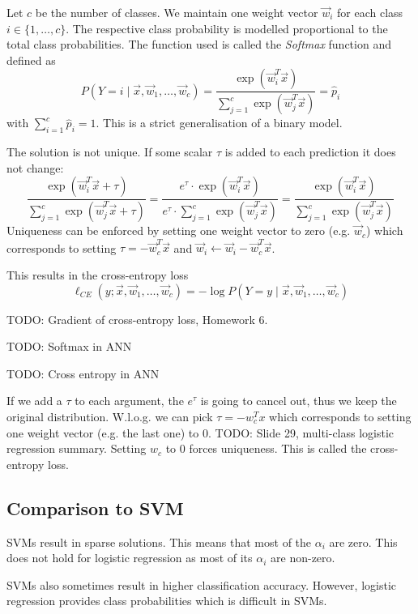 Let $c$ be the number of classes.
We maintain one weight vector
$\vec{w}_i$ for each class $i \in \{1, \dotsc, c\}$.
The respective class probability is modelled
proportional to the total class probabilities.
The function used is called the
\emph{Softmax} function and defined as
\begin{equation*}
    P(Y = i \mid \vec{x}, \vec{w}_1, \dotsc, \vec{w}_c)
    = \frac{\exp{(\vec{w}_i^T \vec{x})}}{
        \sum_{j=1}^c{\exp{(\vec{w}_j^T \vec{x})}}
    }
    = \hat{p}_i
\end{equation*}
with $\sum_{i=1}^c{\hat{p}_i} = 1$.
This is a strict generalisation of a binary model.

The solution is not unique.
If some scalar $\tau$ is added to each prediction
it does not change:
\begin{equation*}
    \frac{\exp{(\vec{w}_i^T \vec{x} + \tau)}}{
        \sum_{j=1}^c{\exp{(\vec{w}_j^T \vec{x} + \tau)}}
    }
    = \frac{e^\tau \cdot \exp{(\vec{w}_i^T \vec{x})}}{
        e^\tau \cdot \sum_{j=1}^c{\exp{(\vec{w}_j^T \vec{x})}}
    }
    = \frac{\exp{(\vec{w}_i^T \vec{x})}}{
        \sum_{j=1}^c{\exp{(\vec{w}_j^T \vec{x})}}
    }
\end{equation*}
Uniqueness can be enforced by setting
one weight vector to zero
(e.g. $\vec{w}_c$) which corresponds
to setting $\tau = -\vec{w}_c^T \vec{x}$
and $\vec{w}_i \gets \vec{w}_i - \vec{w}_c^T \vec{x}$.

This results in the cross-entropy loss
\begin{equation*}
    \ell_{CE}(y ; \vec{x}, \vec{w}_1, \dotsc, \vec{w}_c)
    = - \log{P(Y = y \mid \vec{x}, \vec{w}_1, \dotsc, \vec{w}_c)}
\end{equation*}

TODO: Gradient of cross-entropy loss, Homework 6.

TODO: Softmax in ANN

TODO: Cross entropy in ANN

If we add a $\tau$ to each argument, the $e^\tau$ is going to cancel out,
thus we keep the original distribution.
W.l.o.g. we can pick $\tau = -w_c^T x$ which corresponds to setting one weight vector
(e.g. the last one) to $0$.
TODO: Slide 29, multi-class logistic regression summary.
Setting $w_c$ to $0$ forces uniqueness.
This is called the cross-entropy loss.


\subsection{Comparison to SVM}
SVMs result in sparse solutions.
This means that most of the $\alpha_i$ are zero.
This does not hold for logistic regression as
most of its $\alpha_i$ are non-zero.

SVMs also sometimes result in higher classification
accuracy. However, logistic regression provides
class probabilities which is difficult in SVMs.
